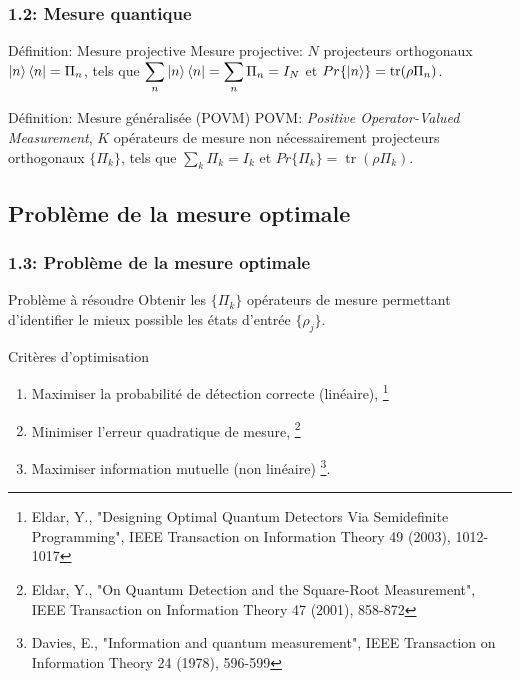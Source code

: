 \documentclass{beamer}
\DeclareMathOperator{\tr}{tr}
\begin{document}
\begin{frame}
    \frametitle{1.2: Mesure quantique}

    \begin{block}{Définition: Mesure projective}
        Mesure projective: $N$ projecteurs orthogonaux $\ket{n}\bra{n} = \Pi_n$, tels que $\displaystyle \sum_n\ket{n}\bra{n} = \displaystyle \sum_n \Pi_n = I_N$ et $Pr\{\ket{n}\} = \tr(\rho \Pi_n)$.
    \end{block}

    \pause

    \begin{block}{Définition: Mesure généralisée (POVM)}
        POVM: \textit{Positive Operator-Valued Measurement}, $K$ opérateurs de mesure non nécessairement projecteurs orthogonaux $\{\Pi_k\}$, tels que $\sum_k \Pi_k = I_k$ et $Pr\{\Pi_k\} = \tr(\rho \Pi_k)$.
    \end{block}
\end{frame}

\subsection{Problème de la mesure optimale}

\begin{frame}
    \frametitle{1.3: Problème de la mesure optimale}

    \begin{block}{Problème à résoudre}
        Obtenir les $\{\Pi_k\}$ opérateurs de mesure permettant d'identifier le mieux possible les états d'entrée $\{\rho_j\}$.
    \end{block}

    \pause

    \begin{block}{Critères d'optimisation}
        \begin{enumerate}
            \item Maximiser la probabilité de détection correcte (linéaire), \footnote{\tiny Eldar, Y., "Designing Optimal Quantum Detectors Via Semidefinite Programming", IEEE Transaction on Information Theory 49 (2003), 1012-1017}
            \item Minimiser l'erreur quadratique de mesure, \footnote{\tiny Eldar, Y., "On Quantum Detection and the Square-Root Measurement", IEEE Transaction on Information Theory 47 (2001), 858-872}
            \item Maximiser information mutuelle (non linéaire) \footnote{\tiny Davies, E., "Information and quantum measurement", IEEE Transaction on Information Theory 24 (1978), 596-599}.
        \end{enumerate}
    \end{block}
\end{frame}
\end{document}
